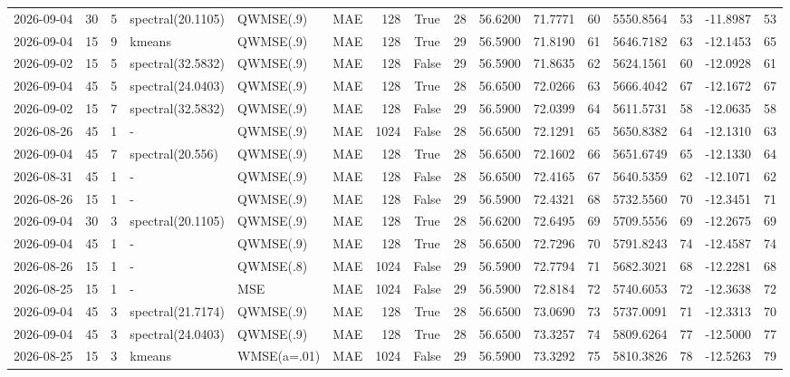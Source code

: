 \documentclass[10pt]{article}
\begin{document}
\begin{landscape}
\begin{longtable}{@{}lrrlllrcrrrrrrrr@{}}
2026-09-04 & 30 & 5 & spectral(20.1105) & QWMSE(.9) & MAE & 128 & True & 28 & 56.6200 & 71.7771 & 60 & 5550.8564 & 53 & -11.8987 & 53 \\
2026-09-04 & 15 & 9 & kmeans & QWMSE(.9) & MAE & 128 & True & 29 & 56.5900 & 71.8190 & 61 & 5646.7182 & 63 & -12.1453 & 65 \\
2026-09-02 & 15 & 5 & spectral(32.5832) & QWMSE(.9) & MAE & 128 & False & 29 & 56.5900 & 71.8635 & 62 & 5624.1561 & 60 & -12.0928 & 61 \\
2026-09-04 & 45 & 5 & spectral(24.0403) & QWMSE(.9) & MAE & 128 & True & 28 & 56.6500 & 72.0266 & 63 & 5666.4042 & 67 & -12.1672 & 67 \\
2026-09-02 & 15 & 7 & spectral(32.5832) & QWMSE(.9) & MAE & 128 & False & 29 & 56.5900 & 72.0399 & 64 & 5611.5731 & 58 & -12.0635 & 58 \\
2026-08-26 & 45 & 1 & - & QWMSE(.9) & MAE & 1024 & False & 28 & 56.6500 & 72.1291 & 65 & 5650.8382 & 64 & -12.1310 & 63 \\
2026-09-04 & 45 & 7 & spectral(20.556) & QWMSE(.9) & MAE & 128 & True & 28 & 56.6500 & 72.1602 & 66 & 5651.6749 & 65 & -12.1330 & 64 \\
2026-08-31 & 45 & 1 & - & QWMSE(.9) & MAE & 128 & False & 28 & 56.6500 & 72.4165 & 67 & 5640.5359 & 62 & -12.1071 & 62 \\
2026-08-26 & 15 & 1 & - & QWMSE(.9) & MAE & 128 & False & 29 & 56.5900 & 72.4321 & 68 & 5732.5560 & 70 & -12.3451 & 71 \\
2026-09-04 & 30 & 3 & spectral(20.1105) & QWMSE(.9) & MAE & 128 & True & 28 & 56.6200 & 72.6495 & 69 & 5709.5556 & 69 & -12.2675 & 69 \\
2026-09-04 & 45 & 1 & - & QWMSE(.9) & MAE & 128 & True & 28 & 56.6500 & 72.7296 & 70 & 5791.8243 & 74 & -12.4587 & 74 \\
2026-08-26 & 15 & 1 & - & QWMSE(.8) & MAE & 1024 & False & 29 & 56.5900 & 72.7794 & 71 & 5682.3021 & 68 & -12.2281 & 68 \\
2026-08-25 & 15 & 1 & - & MSE & MAE & 1024 & False & 29 & 56.5900 & 72.8184 & 72 & 5740.6053 & 72 & -12.3638 & 72 \\
2026-09-04 & 45 & 3 & spectral(21.7174) & QWMSE(.9) & MAE & 128 & True & 28 & 56.6500 & 73.0690 & 73 & 5737.0091 & 71 & -12.3313 & 70 \\
2026-09-04 & 45 & 3 & spectral(24.0403) & QWMSE(.9) & MAE & 128 & True & 28 & 56.6500 & 73.3257 & 74 & 5809.6264 & 77 & -12.5000 & 77 \\
2026-08-25 & 15 & 3 & kmeans & WMSE(a=.01) & MAE & 1024 & False & 29 & 56.5900 & 73.3292 & 75 & 5810.3826 & 78 & -12.5263 & 79 \\

\end{longtable}
\end{landscape}
\end{document}
